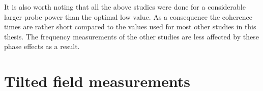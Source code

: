 It is also worth noting that all the above studies were done for a
considerable larger probe power than the optimal low value.  As a
consequence the coherence times are rather short compared to the
values used for most other studies in this thesis.  The frequency
measurements of the other studies are less affected by these phase
effects as a result.


\section{Tilted field measurements} 
\label{sec:tilted-results}


%



